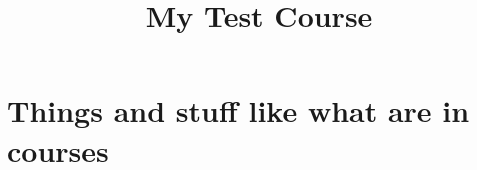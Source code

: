 \documentclass[10pt,handout,twocolumn,wordchoicegiven]{xourse}
\title{My Test Course}
\begin{document}
\maketitle

\setcounter{tocdepth}{2}

\part{Things and stuff like what are in courses}

\chapterstyle

\sectionstyle




\iftikzexport\else\printindex\fi
\end{document}
